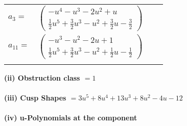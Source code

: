 \documentclass[1p]{elsarticle_modified}
\theoremstyle{definition}
\begin{document}
\begin{tabular}{m{7pt} m{180pt} m{7pt} m{180pt} }
\flushright $a_{3}=$&$\begin{pmatrix}- u^4- u^3-2 u^2+u\\\frac{1}{2} u^5+\frac{3}{2} u^3- u^2+\frac{3}{2} u-\frac{3}{2}\end{pmatrix}$ \\
\flushright $a_{11}=$&$\begin{pmatrix}- u^3- u^2-2 u+1\\\frac{1}{2} u^5+\frac{3}{2} u^3- u^2+\frac{1}{2} u-\frac{1}{2}\end{pmatrix}$\\&\end{tabular}
\flushleft \textbf{(ii) Obstruction class $= 1$}\\~\\
\flushleft \textbf{(iii) Cusp Shapes $= 3 u^5+8 u^4+13 u^3+8 u^2-4 u-12$}\\~\\
\newpage\renewcommand{\arraystretch}{1}
\flushleft \textbf{(iv) u-Polynomials at the component}\newline \\
\end{document}
